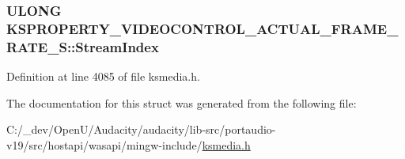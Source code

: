 \subsubsection[{\texorpdfstring{Stream\+Index}{StreamIndex}}]{\setlength{\rightskip}{0pt plus 5cm}U\+L\+O\+NG K\+S\+P\+R\+O\+P\+E\+R\+T\+Y\+\_\+\+V\+I\+D\+E\+O\+C\+O\+N\+T\+R\+O\+L\+\_\+\+A\+C\+T\+U\+A\+L\+\_\+\+F\+R\+A\+M\+E\+\_\+\+R\+A\+T\+E\+\_\+\+S\+::\+Stream\+Index}\hypertarget{struct_k_s_p_r_o_p_e_r_t_y___v_i_d_e_o_c_o_n_t_r_o_l___a_c_t_u_a_l___f_r_a_m_e___r_a_t_e___s_ace807cd9eaef0e6a5e6f54b2aec8e4ff}{}\label{struct_k_s_p_r_o_p_e_r_t_y___v_i_d_e_o_c_o_n_t_r_o_l___a_c_t_u_a_l___f_r_a_m_e___r_a_t_e___s_ace807cd9eaef0e6a5e6f54b2aec8e4ff}


Definition at line 4085 of file ksmedia.\+h.



The documentation for this struct was generated from the following file\+:\begin{DoxyCompactItemize}
\item 
C\+:/\+\_\+dev/\+Open\+U/\+Audacity/audacity/lib-\/src/portaudio-\/v19/src/hostapi/wasapi/mingw-\/include/\hyperlink{ksmedia_8h}{ksmedia.\+h}\end{DoxyCompactItemize}
